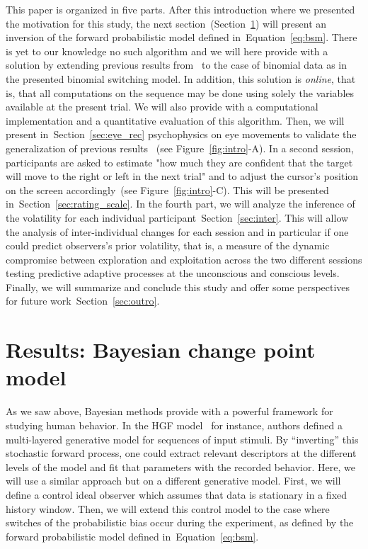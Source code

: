 \documentclass[profile,final,english,draft]{article}%
\newcommand{\citep}[1]{\parencite{#1}}
\newcommand{\citet}[1]{\textcite{#1}}
\newcommand{\seeFig}[1]{Figure~\ref{fig:#1}}
\newcommand{\seeEq}[1]{Equation~\ref{eq:#1}}
\newcommand{\seeSec}[1]{Section~\ref{sec:#1}}
\begin{document}
This paper is organized in five parts.
After this introduction where we presented the motivation for this study,
the next section~(\seeSec{bayesian_change_point}) will present
an inversion of the forward probabilistic model defined in~\seeEq{bsm}.
There is yet to our knowledge no such algorithm and
we will here provide with a solution
by extending previous results from~\citet{AdamsMackay2007}
to the case of binomial data as in the presented binomial switching model.
In addition, this solution is \emph{online},
that is, that all computations on the sequence may be done 
using solely the variables available at the present trial.
We will also provide with a computational implementation
and a quantitative evaluation of this algorithm.
Then, we will present in~\seeSec{eye_rec} psychophysics on eye movements
to validate the generalization of previous results%
~(see \seeFig{intro}-A).
In a second session, participants are asked to estimate
"how much they are confident that
the target will move to the right or left in the next trial" and
to adjust the cursor's position on the screen accordingly~(see \seeFig{intro}-C).
This will be presented in~\seeSec{rating_scale}.
In the fourth part, we will analyze the inference of the volatility
for each individual participant~\seeSec{inter}.
This will allow the analysis of inter-individual changes for each session
and in particular if one could predict observers's prior volatility,
that is, a measure of the dynamic compromise between exploration and exploitation
across the two different sessions testing predictive adaptive processes
at the unconscious and conscious levels.
Finally, we will summarize and conclude this study and
offer some perspectives for future work~\seeSec{outro}.
\section{Results: Bayesian change point model}
\label{sec:bayesian_change_point}
%
%
As we saw above, Bayesian methods provide with
a powerful framework for studying human behavior.
In the HGF model~\citep{Mathys11} for instance,
authors defined a multi-layered generative model for
sequences of input stimuli.
By ``inverting'' this stochastic forward process,
one could extract relevant descriptors at the different levels of the model
and fit that parameters with the recorded behavior.
Here, we will use a similar approach but on a different generative model.
First, we will define a control ideal observer
which assumes that data is stationary in a fixed history window.
Then, we will extend this control model to the case
where switches of the probabilistic bias occur during the experiment,
as defined by the forward probabilistic model defined in~\seeEq{bsm}.
%
\end{document}
